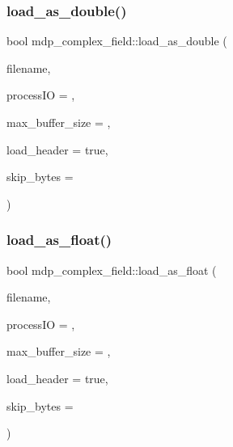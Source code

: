 \subsubsection{\texorpdfstring{load\+\_\+as\+\_\+double()}{load\_as\_double()}}
{\footnotesize\ttfamily bool mdp\+\_\+complex\+\_\+field\+::load\+\_\+as\+\_\+double (\begin{DoxyParamCaption}\item[{string}]{filename,  }\item[{int}]{process\+IO = {},  }\item[{\hyperlink{mdp__global__vars_8h_aaa1ad9d0dcd2124aa5af0120d9954174}{mdp\+\_\+int}}]{max\+\_\+buffer\+\_\+size = {},  }\item[{bool}]{load\+\_\+header = {\ttfamily true},  }\item[{\hyperlink{mdp__global__vars_8h_aaa1ad9d0dcd2124aa5af0120d9954174}{mdp\+\_\+int}}]{skip\+\_\+bytes = {} }\end{DoxyParamCaption})\hspace{0.3cm}{\ttfamily [inline]}}

\mbox{\label{classmdp__complex__field_a41ca79e9686143c660588426dc71dd0b}} 
\subsubsection{\texorpdfstring{load\+\_\+as\+\_\+float()}{load\_as\_float()}}
{\footnotesize\ttfamily bool mdp\+\_\+complex\+\_\+field\+::load\+\_\+as\+\_\+float (\begin{DoxyParamCaption}\item[{string}]{filename,  }\item[{int}]{process\+IO = {},  }\item[{\hyperlink{mdp__global__vars_8h_aaa1ad9d0dcd2124aa5af0120d9954174}{mdp\+\_\+int}}]{max\+\_\+buffer\+\_\+size = {},  }\item[{bool}]{load\+\_\+header = {\ttfamily true},  }\item[{\hyperlink{mdp__global__vars_8h_aaa1ad9d0dcd2124aa5af0120d9954174}{mdp\+\_\+int}}]{skip\+\_\+bytes = {} }\end{DoxyParamCaption})\hspace{0.3cm}{\ttfamily [inline]}}

